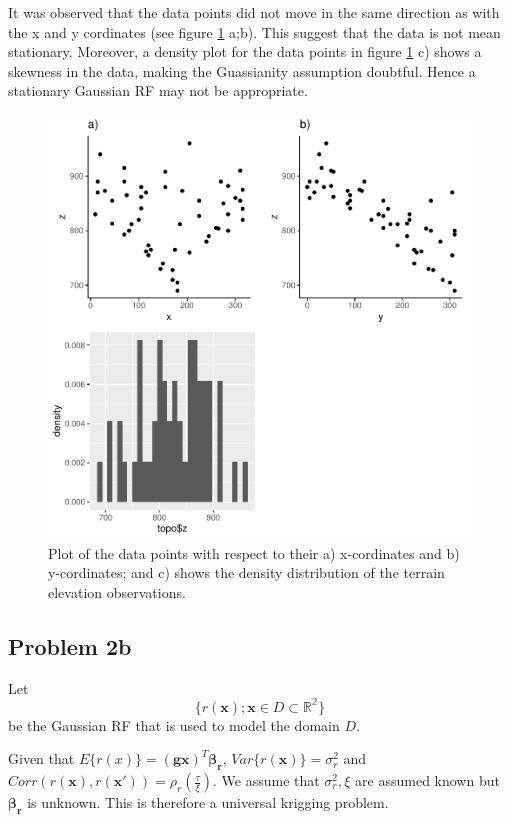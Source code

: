 \documentclass[]{article}
\newcommand{\vect}[1]{\ensuremath{\boldsymbol{\mathbf{#1}}}}
\begin{document}
It was observed that the data points did not move in the same direction
as with the x and y cordinates (see figure \ref{fig:fig2} a;b). This
suggest that the data is not mean stationary. Moreover, a density plot
for the data points in figure \ref{fig:fig2} c) shows a skewness in the
data, making the Guassianity assumption doubtful. Hence a stationary
Gaussian RF may not be appropriate.

\begin{figure}
\centering
\includegraphics{Exercise_1_files/figure-latex/fig2-1.pdf}
\caption{\label{fig:fig2} Plot of the data points with respect to their
a) x-cordinates and b) y-cordinates; and c) shows the density
distribution of the terrain elevation observations.}
\end{figure}

\subsection{Problem 2b}\label{problem-2b}

Let \[
\{r (\vect{x}); \vect{x} \in D \subset \mathbb{R^2}\}
\] be the Gaussian RF that is used to model the domain \(D\).

Given that \(E\{r(x)\} = (\vect{gx})^T \vect{\beta_r}\),
\(Var\{r(\vect{x})\} = \sigma_r^2\) and
\(Corr(r(\vect{x}), r(\vect{x'})) = \rho_r(\frac{\tau}{\xi})\). We
assume that \(\sigma_r^2, \xi\) are assumed known but \(\vect{\beta_r}\)
is unknown. This is therefore a universal krigging problem.
\end{document}
